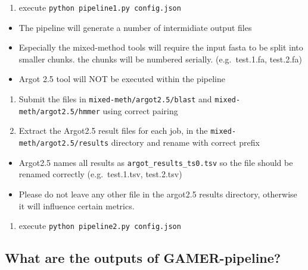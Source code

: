 \documentclass[11pt,letterpaper]{article}
\begin{document}
\begin{enumerate}
 \def\labelenumi{\arabic{enumi}.}
 \setcounter{enumi}{2}
 \tightlist
 \item
       execute \texttt{python\ pipeline1.py\ config.json}
\end{enumerate}

\begin{itemize}
 \tightlist
 \item
       The pipeline will generate a number of intermidiate output files
 \item
       Especially the mixed-method tools will require the input fasta to be
       split into smaller chunks. the chunks will be numbered serially.
       (e.g.~test.1.fa, test.2.fa)
 \item
       Argot 2.5 tool will NOT be executed within the pipeline
\end{itemize}

\begin{enumerate}
 \def\labelenumi{\arabic{enumi}.}
 \setcounter{enumi}{3}
 \tightlist
 \item
       Submit the files in \texttt{mixed-meth/argot2.5/blast} and
       \texttt{mixed-meth/argot2.5/hmmer} using correct pairing
 \item
       Extract the Argot2.5 result files for each job, in the
       \texttt{mixed-meth/argot2.5/results} directory and rename with correct
       prefix
\end{enumerate}

\begin{itemize}
 \tightlist
 \item
       Argot2.5 names all results as \texttt{argot\_results\_ts0.tsv} so the
       file should be renamed correctly (e.g.~test.1.tsv, test.2.tsv)
 \item
       Please do not leave any other file in the argot2.5 results directory,
       otherwise it will influence certain metrics.
\end{itemize}

\begin{enumerate}
 \def\labelenumi{\arabic{enumi}.}
 \setcounter{enumi}{5}
 \tightlist
 \item
       execute \texttt{python\ pipeline2.py\ config.json}
\end{enumerate}

\subsection{What are the outputs of
 GAMER-pipeline?}\label{what-are-the-outputs-of-gamer-pipeline}
\end{document}
